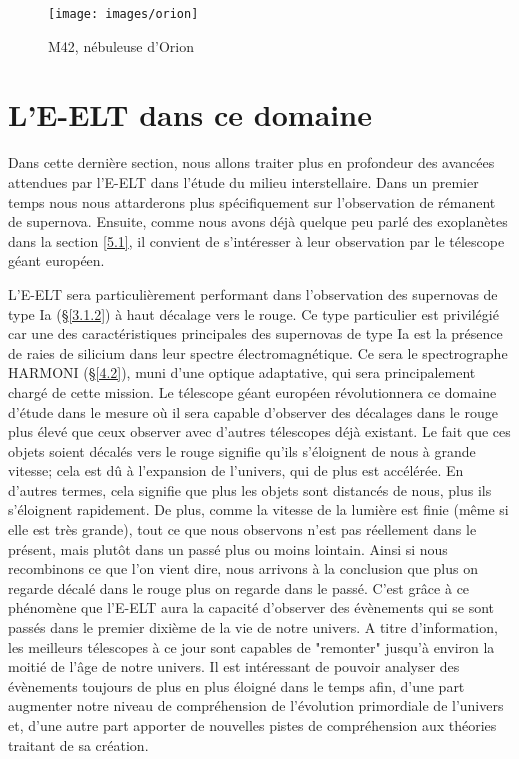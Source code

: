 \begin{figure}[H]
	\centering
	\texttt{[image: images/orion]}
	\caption[M42, nébuleuse d'Orion - astrophoto prise par René Lemoine en 2018 avec une lunette TS APO 80 et une caméra QHY10 (5 heures de pose)]{M42, nébuleuse d'Orion}
	\label{Fig. 5.1}
\end{figure}\bigskip



\section{ L'E-ELT dans ce domaine}\label{5.2}

Dans cette dernière section, nous allons traiter plus en profondeur des avancées attendues par l'E-ELT dans l'étude du milieu interstellaire. Dans un premier temps nous nous attarderons plus spécifiquement sur l'observation de rémanent de supernova. Ensuite, comme nous avons déjà quelque peu parlé des exoplanètes dans la section \ref{5.1}, il convient de s'intéresser à leur observation par le télescope géant européen.\medskip

L'E-ELT sera particulièrement performant dans l'observation des supernovas de type Ia (§\ref{3.1.2}) à haut décalage vers le rouge. Ce type particulier est privilégié car une des caractéristiques principales des supernovas de type Ia est la présence de raies de silicium dans leur spectre électromagnétique. Ce sera le spectrographe HARMONI (§\ref{4.2}), muni d'une optique adaptative, qui sera principalement chargé de cette mission. Le télescope géant européen révolutionnera ce domaine d'étude dans le mesure où il sera capable d'observer des décalages dans le rouge plus élevé que ceux observer avec d'autres télescopes déjà existant. Le fait que ces objets soient décalés vers le rouge signifie qu'ils s'éloignent de nous à grande vitesse; cela est dû à l'expansion de l'univers, qui de plus est accélérée. En d'autres termes, cela signifie que plus les objets sont distancés de nous, plus ils s'éloignent rapidement. De plus, comme la vitesse de la lumière est finie (même si elle est très grande), tout ce que nous observons n'est pas réellement dans le présent, mais plutôt dans un passé plus ou moins lointain. Ainsi si nous recombinons ce que l'on vient dire, nous arrivons à la conclusion que plus on regarde décalé dans le rouge plus on regarde dans le passé. C'est grâce à ce phénomène que l'E-ELT aura la capacité d'observer des évènements qui se sont passés dans le premier dixième de la vie de notre univers. A titre d'information, les meilleurs télescopes à ce jour sont capables de "remonter" jusqu'à environ la moitié de l'âge de notre univers. Il est intéressant de pouvoir analyser des évènements toujours de plus en plus éloigné dans le temps afin, d'une part augmenter notre niveau de compréhension de l'évolution primordiale de l'univers et, d'une autre part apporter de nouvelles pistes de compréhension aux théories traitant de sa création.\medskip

